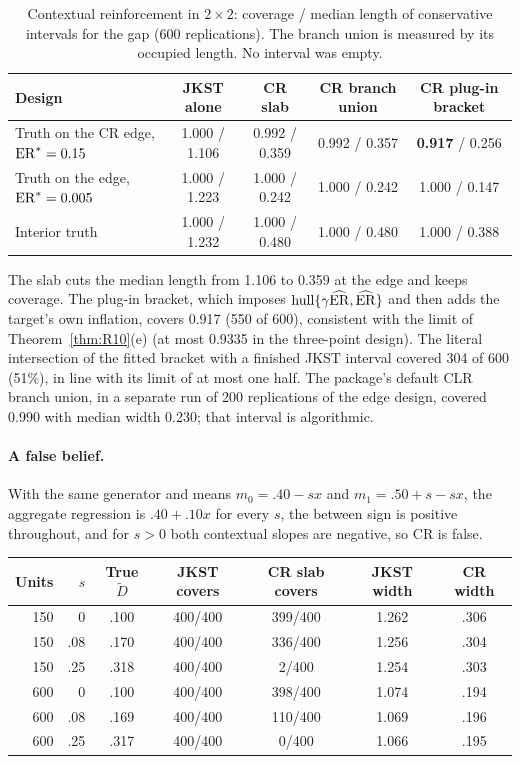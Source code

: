 \begin{table}[t]
\centering\footnotesize
\begin{tabular}{@{}lcccc@{}}
\toprule
Design & JKST alone & CR slab & CR branch union & CR plug-in bracket \\
\midrule
Truth on the CR edge, $\mathrm{ER}^*=0.15$ & 1.000 / 1.106 & 0.992 / 0.359 & 0.992 / 0.357 & \textbf{0.917} / 0.256 \\
Truth on the edge, $\mathrm{ER}^*=0.005$ & 1.000 / 1.223 & 1.000 / 0.242 & 1.000 / 0.242 & 1.000 / 0.147 \\
Interior truth & 1.000 / 1.232 & 1.000 / 0.480 & 1.000 / 0.480 & 1.000 / 0.388 \\
\bottomrule
\end{tabular}
\caption{Contextual reinforcement in $2\times2$: coverage / median length of conservative intervals for the gap (600 replications). The branch union is measured by its occupied length. No interval was empty.}\label{tab:cr}
\end{table}

The slab cuts the median length from 1.106 to 0.359 at the edge and keeps coverage.
The plug-in bracket, which imposes $\operatorname{hull}\{\gamma\widehat{\mathrm{ER}},\widehat{\mathrm{ER}}\}$ and then
adds the target's own inflation, covers 0.917 (550 of 600), consistent with the limit of
Theorem~\ref{thm:R10}(e) (at most 0.9335 in the three-point design). The literal
intersection of the fitted bracket with a finished JKST interval covered 304 of 600
(51\%), in line with its limit of at most one half. The package's default CLR branch
union, in a separate run of 200 replications of the edge design, covered 0.990 with
median width 0.230; that interval is algorithmic.

\paragraph{A false belief.} With the same generator and means $m_0=.40-sx$ and
$m_1=.50+s-sx$, the aggregate regression is $.40+.10x$ for every $s$, the between
sign is positive throughout, and for $s>0$ both contextual slopes are negative, so
CR is false.

\begin{center}\small
\begin{tabular}{@{}rrccccc@{}}
\toprule
Units & $s$ & True $\tilde D$ & JKST covers & CR slab covers & JKST width & CR width \\
\midrule
150 & 0 & .100 & 400/400 & 399/400 & 1.262 & .306 \\
150 & .08 & .170 & 400/400 & 336/400 & 1.256 & .304 \\
150 & .25 & .318 & 400/400 & 2/400 & 1.254 & .303 \\
600 & 0 & .100 & 400/400 & 398/400 & 1.074 & .194 \\
600 & .08 & .169 & 400/400 & 110/400 & 1.069 & .196 \\
600 & .25 & .317 & 400/400 & 0/400 & 1.066 & .195 \\
\bottomrule
\end{tabular}
\end{center}

